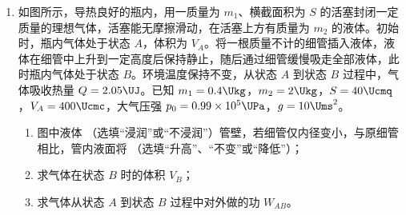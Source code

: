 \documentclass[\gkver]{gaokaozhenti}
\begin{document}
\begin{enumerate}
{C．变压器的工作原理是电磁感应，需要交流电源，不能用直流电源，C 错误。

D．变压器输出的是交流电，测量其电压时，多用电表选择开关应调至交流电压挡，D 正确。

故选 BD。

（3）由题意可知下层线圈输入的是锯齿波电压，它的变化率（斜率）在每个周期内是恒定的；根据电磁感应原理可知上层线圈的感应电动势与磁通量的变化率成正比，也就是与输入电压的变化率成正比；输入电压的斜率恒定，所以感应电动势的大小也恒定，对应的波形是方波。故选 C。

Ⅲ．（1）A．撒粉太少会导致油膜扩散时没有足够阻力，可能扩散得过大甚至溢出，或者边界模糊不清；而图中油膜呈现“尖刺”、“星芒”状，通常是撒粉太多或不均匀，导致油膜在局部被阻挡，无法均匀铺展，从而形成这种不规则形状，故 A 错误；

B．按图示油膜面积计算时，测量的面积比实际油膜的面积会更小，根据 $d=\frac{V}{S}$ 可知测得油酸分子直径偏大，故 B 正确；

C．油酸酒精溶液放置长时间后使用，因为酒精的挥发，在溶液中的油酸浓度会偏大，油酸的体积会偏大，但实际计算时仍按原来的浓度计算，则计算所用的油酸体积偏小，根据 $d=\frac{V}{S}$ 可知测得油酸分子直径偏小，故 C 错误。

故选 B。

（2）多于半格不足整格的按整格计算，故总的格子数为 $N_{1} + N_{2}$，则总面积为 $S_{\text{总}} = S(N_{1} + N_{2})$，则油酸分子直径为 $d = \frac{V}{S_{\text{总}}} = \frac{V}{(N_{1} + N_{2})S}$。
}

\item
如图所示，导热良好的瓶内，用一质量为 $m_{1}$、横截面积为 $S$ 的活塞封闭一定质量的理想气体，活塞能无摩擦滑动，在活塞上方有质量为 $m_{2}$ 的液体。初始时，瓶内气体处于状态 $A$，体积为 $V_{A}$。将一根质量不计的细管插入液体，液体在细管中上升到一定高度后保持静止，随后通过细管缓慢吸走全部液体，此时瓶内气体处于状态 $B$。环境温度保持不变，从状态 $A$ 到状态 $B$ 过程中，气体吸收热量 $Q = 2.05\UJ$。已知 $m_{1} = 0.4\Ukg$，$m_{2} = 2\Ukg$，$S = 40\Ucmq$，$V_{A} = 400\Ucmc$，大气压强 $p_{0} = 0.99\times10^{5}\UPa$，$g = 10\Ums^{2}$。
\begin{enumerate}
	\item
	图中液体  （选填“浸润”或“不浸润”）管壁，若细管仅内径变小，与原细管相比，管内液面将  （选填“升高”、“不变”或“降低”）；
	\item
	求气体在状态 $B$ 时的体积 $V_{B}$；
	\item
	求气体从状态 $A$ 到状态 $B$ 过程中对外做的功 $W_{AB}$。
\end{enumerate}
\end{enumerate}
\end{document}
